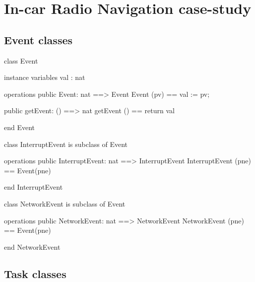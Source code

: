 %
%

\section{In-car Radio Navigation case-study}

\subsection{Event classes}

\begin{vdm_al}
class Event

instance variables
  val : nat

operations
  public Event: nat ==> Event
  Event (pv) == val := pv;

  public getEvent: () ==> nat
  getEvent () == return val

end Event
\end{vdm_al}

\begin{vdm_al}
class InterruptEvent
  is subclass of Event

operations
  public InterruptEvent: nat ==> InterruptEvent
  InterruptEvent (pne) == Event(pne)

end InterruptEvent
\end{vdm_al}

\begin{vdm_al}
class NetworkEvent
  is subclass of Event

operations
  public NetworkEvent: nat ==> NetworkEvent
  NetworkEvent (pne) == Event(pne)

end NetworkEvent
\end{vdm_al}

\subsection{Task classes}

